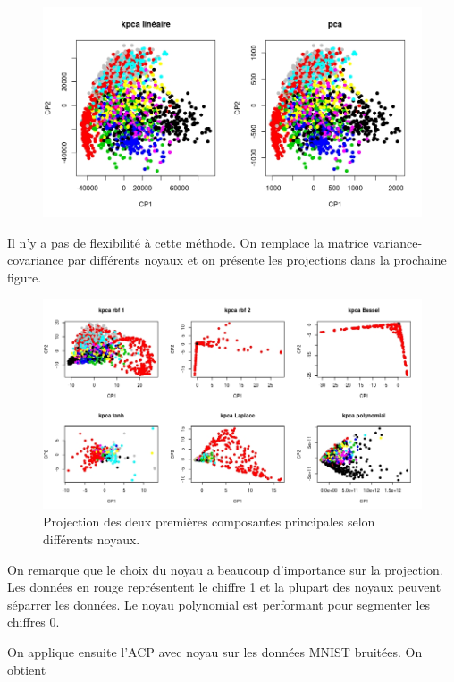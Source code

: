 \begin{figure}[H]
	\includegraphics[width=\textwidth]{comparaison-lineaire}
\end{figure}

Il n'y a pas de flexibilité à cette méthode. On remplace la matrice variance-covariance par différents noyaux et on présente les projections dans la prochaine figure. 

\begin{figure}[H]
	\includegraphics[width=\textwidth]{comparaison-kernel}
	\caption{Projection des deux premières composantes principales selon différents noyaux.}
\end{figure}

On remarque que le choix du noyau a beaucoup d'importance sur la projection. Les données en rouge représentent le chiffre 1 et la plupart des noyaux peuvent séparrer les données. Le noyau polynomial est performant pour segmenter les chiffres 0. 

On applique ensuite l'ACP avec noyau sur les données MNIST bruitées. On obtient 

